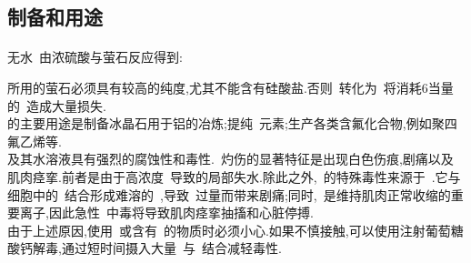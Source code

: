 \documentclass{ctexbook}
\begin{document}
\subsection{制备和用途}
\paragraph{}
无水~由浓硫酸与萤石反应得到:
\begin{tightcenter}
\end{tightcenter}
所用的萤石必须具有较高的纯度,尤其不能含有硅酸盐.否则~转化为~将消耗$6$当量的~造成大量损失.\\
\indent {}的主要用途是制备冰晶石用于铝的冶炼;提纯~元素;生产各类含氟化合物,例如聚四氟乙烯等.\\
\indent {}及其水溶液具有强烈的腐蚀性和毒性.~灼伤的显著特征是出现白色伤痕,剧痛以及肌肉痉挛.前者是由于高浓度~导致的局部失水.除此之外,~的特殊毒性来源于~.它与细胞中的~结合形成难溶的~,导致~过量而带来剧痛;同时,~是维持肌肉正常收缩的重要离子,因此急性~中毒将导致肌肉痉挛抽搐和心脏停搏.\\
\indent 由于上述原因,使用~或含有~的物质时必须小心.如果不慎接触,可以使用注射葡萄糖酸钙解毒,通过短时间摄入大量~与~结合减轻毒性.
\end{document}
